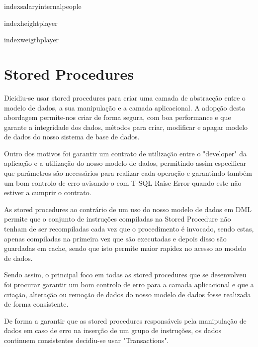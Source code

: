\documentclass[pdftex,12pt,a4paper]{report}
\begin{document}
indexsalaryinternalpeople

indexheightplayer

indexweigthplayer

\newpage
\section{Stored Procedures}
Dicidiu-se usar stored procedures para criar uma camada de abstracção entre o modelo de dados, a sua manipulação e a camada aplicacional. A adopção desta abordagem permite-nos criar de forma segura, com boa performance e que garante a integridade dos dados, métodos para criar, modificar e apagar modelo de dados do nosso sistema de base de dados.

Outro dos motivos foi garantir um contrato de utilização entre o "developer" da aplicação e a utilização do nosso modelo de dados, permitindo assim especificar que parâmetros são necessários para realizar cada operação e garantindo também um bom controlo de erro avisando-o com T-SQL Raise Error quando este não estiver a cumprir o contrato.

As stored procedures ao contrário de um uso do nosso modelo de dados em DML permite que o conjunto de instruções compiladas na Stored Procedure  não tenham de ser recompiladas cada vez que o procedimento é invocado, sendo estas, apenas compiladas na primeira vez que são executadas e depois disso são guardadas em cache, sendo que isto permite maior rapidez no acesso ao modelo de dados.

Sendo assim, o principal foco em todas as stored procedures que se desenvolveu foi procurar garantir um bom controlo de erro para a camada aplicacional e que a criação, alteração ou remoção de dados do nosso modelo de dados fosse realizada de forma consistente.

De forma a garantir que as stored procedures responsáveis pela manipulação de dados em caso de erro na inserção de um grupo de instruções, os dados continuem consistentes  decidiu-se usar "Transactions".
\end{document}
